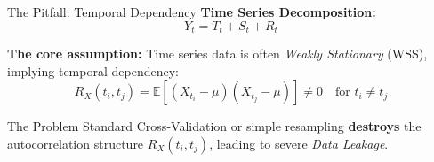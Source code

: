 \begin{frame}{The Pitfall: Temporal Dependency}
    \textbf{Time Series Decomposition:}
    $$Y_t = T_t + S_t + R_t$$
    \vspace{0.2cm}

    \textbf{The core assumption:} Time series data is often \textit{Weakly Stationary} (WSS), implying temporal dependency:
    $$R_X(t_i, t_j) = \mathbb{E}[(X_{t_i} - \mu)(X_{t_j} - \mu)] \neq 0 \quad \text{for } t_i \neq t_j$$
    \vspace{0.2cm}

    \begin{alertblock}{The Problem}
        Standard Cross-Validation or simple resampling \textbf{destroys} the autocorrelation structure $R_X(t_i, t_j)$, leading to severe \textit{Data Leakage}.
    \end{alertblock}
\end{frame}